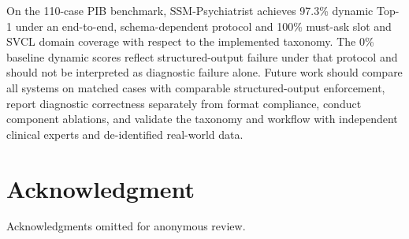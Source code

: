 \documentclass[conference]{IEEEtran}
\begin{document}
On the 110-case PIB benchmark, SSM-Psychiatrist achieves 97.3\% dynamic Top-1 under an end-to-end, schema-dependent protocol and 100\% must-ask slot and SVCL domain coverage with respect to the implemented taxonomy. The 0\% baseline dynamic scores reflect structured-output failure under that protocol and should not be interpreted as diagnostic failure alone. Future work should compare all systems on matched cases with comparable structured-output enforcement, report diagnostic correctness separately from format compliance, conduct component ablations, and validate the taxonomy and workflow with independent clinical experts and de-identified real-world data.


\section*{Acknowledgment}
Acknowledgments omitted for anonymous review.



\end{document}
